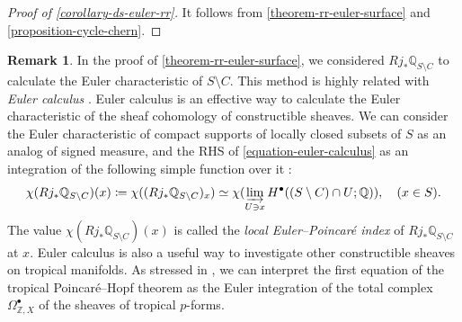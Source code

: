 \documentclass[a4paper,dvipdfmx,reqno,12pt]{amsart}
\theoremstyle{definition}
\newtheorem{example}[theorem]{Example}
\newtheorem{remark}[theorem]{Remark}
\newcommand{\deq}{\coloneqq}
\newcommand{\opn}[1]{\operatorname{#1}}
\numberwithin{equation}{section}
\begin{document}
\begin{proof}[{Proof of \cref{corollary-ds-euler-rr}}]
It follows from
\cref{theorem-rr-euler-surface} and
\cref{proposition-cycle-chern}.
\end{proof}

\begin{remark}
In the proof of \cref{theorem-rr-euler-surface},
we considered $Rj_*\mathbb{Q}_{S\setminus C}$ to calculate
the Euler characteristic of $S\setminus C$.
This method is highly related with \emph{Euler calculus}
\cite{MR970076,MR1115569}.
Euler calculus is an effective way to calculate
the Euler characteristic of the sheaf cohomology of
constructible sheaves. We can consider 
the Euler characteristic of compact supports of 
locally closed subsets of $S$
as an analog of signed measure,
and the RHS of \cref{equation-euler-calculus} as an
integration of the following simple function over it
\cite[(3.4)]{MR1115569}:
\begin{align}
\chi(Rj_*\mathbb{Q}_{S\setminus C})(x)\deq \chi((Rj_*\mathbb{Q}_{S\setminus C})_x) 
\simeq \chi(\varinjlim_{U\ni x} H^{\bullet}((S\setminus C)
\cap U;\mathbb{Q})), \quad (x\in S).
\end{align}
The value $\chi(Rj_*\mathbb{Q}_{S\setminus C})(x)$ is
called the \emph{local Euler--Poincar\'e index} of 
$Rj_*\mathbb{Q}_{S\setminus C}$ at $x$.
Euler calculus is also a useful way to
investigate other constructible sheaves
on tropical manifolds.
As stressed in \cite[Remark 4.8]{MR4540954},
we can interpret the first equation of 
the tropical Poincar\'e--Hopf theorem
\cite[Theorem 4.7]{MR4540954} as 
the Euler integration of the total complex
$\Omega^{\bullet}_{\mathbb{Z},X}$ of the sheaves of
tropical $p$-forms.
\end{remark}

\end{document}
